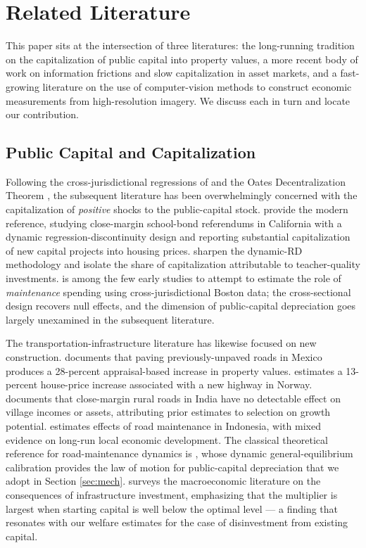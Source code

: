 \section{Related Literature} \label{sec:lit_review}

This paper sits at the intersection of three literatures: the long-running tradition on the capitalization of public capital into property values, a more recent body of work on information frictions and slow capitalization in asset markets, and a fast-growing literature on the use of computer-vision methods to construct economic measurements from high-resolution imagery. We discuss each in turn and locate our contribution.

\subsection*{Public Capital and Capitalization}

Following the cross-jurisdictional regressions of \citet{Oates1969} and the Oates Decentralization Theorem \citep{Oates1972}, the subsequent literature has been overwhelmingly concerned with the capitalization of {\it positive} shocks to the public-capital stock. \citet{cellini2010value} provide the modern reference, studying close-margin school-bond referendums in California with a dynamic regression-discontinuity design and reporting substantial capitalization of new capital projects into housing prices. \citet{biasi_what_2025} sharpen the dynamic-RD methodology and isolate the share of capitalization attributable to teacher-quality investments. \citet{edel1974taxes} is among the few early studies to attempt to estimate the role of {\it maintenance} spending using cross-jurisdictional Boston data; the cross-sectional design recovers null effects, and the dimension of public-capital depreciation goes largely unexamined in the subsequent literature.

The transportation-infrastructure literature has likewise focused on new construction. \citet{gonzalez2016paving} documents that paving previously-unpaved roads in Mexico produces a 28-percent appraisal-based increase in property values. \citet{theisen2021road} estimates a 13-percent house-price increase associated with a new highway in Norway. \citet{asher2020} documents that close-margin rural roads in India have no detectable effect on village incomes or assets, attributing prior estimates to selection on growth potential. \citet{gertler2024road} estimates effects of road maintenance in Indonesia, with mixed evidence on long-run local economic development. The classical theoretical reference for road-maintenance dynamics is \citet{rioja2003}, whose dynamic general-equilibrium calibration provides the law of motion for public-capital depreciation that we adopt in Section \ref{sec:mech}. \citet{ramey2021infrastructure} surveys the macroeconomic literature on the consequences of infrastructure investment, emphasizing that the multiplier is largest when starting capital is well below the optimal level --- a finding that resonates with our welfare estimates for the case of disinvestment from existing capital.

